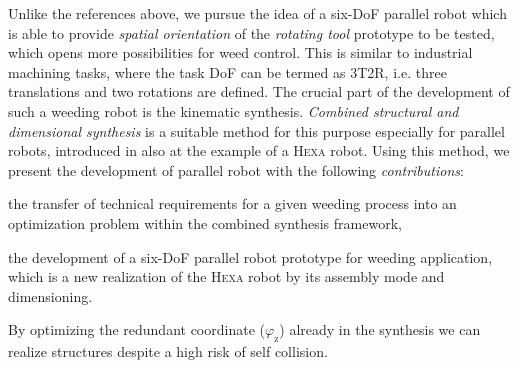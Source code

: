 \documentclass[runningheads]{llncs}
\begin{document}
Unlike the references above, we pursue the idea of a six-DoF parallel robot which is able to provide \emph{spatial orientation} of the \emph{rotating tool} prototype to be tested, which opens more possibilities for weed control.
This is similar to industrial machining tasks, where the task DoF can be termed as 3T2R, i.e. three translations and two rotations are defined.
The crucial part of the development of such a weeding robot is the kinematic synthesis. %
\emph{Combined structural and dimensional synthesis} is a suitable method for this purpose especially for parallel robots, introduced in \cite{Krefft2006} also at the example of a \textsc{Hexa} robot. 
Using this method, we present the development of parallel robot  with the following \emph{contributions}:
\begin{compactitem}
    \item the transfer of technical requirements for a given weeding process into an optimization problem within the combined synthesis framework,
    \item the development of a six-DoF parallel robot prototype for weeding application, which is a new realization of the \textsc{Hexa} robot by its assembly mode and dimensioning. 
    \item By optimizing the redundant coordinate ($\varphi_\text{z}$) already in the synthesis we can realize structures despite a high risk of self collision.\\
\end{compactitem}
\end{document}
